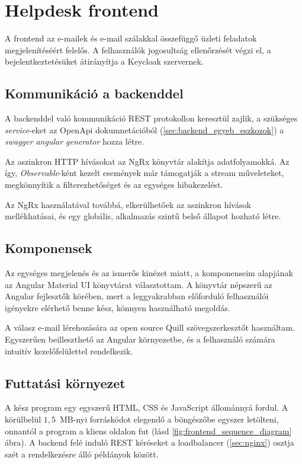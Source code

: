 \section{Helpdesk frontend}
A frontend az e-mailek és e-mail szálakkal összefüggő üzleti feladatok megjelenítéséért felelős. A felhasználók jogosultság ellenőrzését végzi el, a bejelentkeztetésüket átirányítja a Keycloak szervernek. 


\subsection{Kommunikáció a backenddel}
A backenddel való kommunikáció REST protokollon keresztül zajlik, a szükséges \textit{service}-eket az OpenApi dokumnetációból (\ref{sec:backend_egyeb_eszkozok}) a \textit{swagger angular generator} hozza létre.

Az aszinkron HTTP hívásokat az NgRx könyvtár alakítja adatfolyamokká. 
Az így, \textit{Observable}-ként kezelt események már támogatják a stream műveleteket, megkönnyítik a filterezhetőséget és az egységes hibakezelést. 

Az NgRx használatával továbbá, elkerülhetőek az aszinkron hívások mellékhatásai, és egy globális, alkalmazás szintű belső állapot hozható létre.

\subsection{Komponensek}
Az egységes megjelenés és az ismerős kinézet miatt, a komponenseim alapjának az Angular Material UI könyvtárat választottam. A könyvtár	népszerű az Angular fejlesztők körében, mert a leggyakrabban előforduló felhasználói igényekre elérhető benne kész, könnyen használható megoldás.

A válasz e-mail lérehozására az open source Quill szövegszerkesztőt használtam.
Egyszerűen beilleszthető az Angular környezetbe, és a felhasználó számára intuitív kezelőfelülettel rendelkezik.


\subsection{Futtatási környezet}
A kész program egy egyszerű HTML, CSS és JavaScript állománnyá fordul. A körülbelül $1,5$~MB-nyi forráskódot elegendő a böngészőbe egyszer letölteni, onnantól a program a kliens oldalon fut (lásd \ref{fig:frontend_sequence_diagram} ábra). A backend felé induló REST kéréseket a loadbalancer (\ref{sec:nginx}) osztja szét a rendelkezésre álló példányok között.

